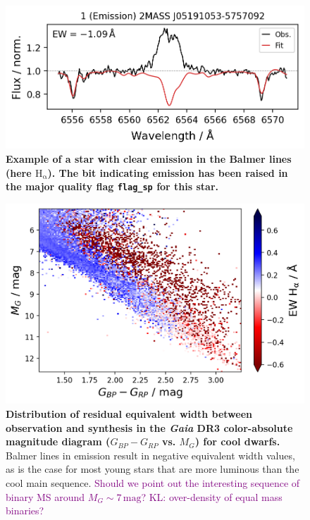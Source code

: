 \documentclass[
  journal=pasa,
  manuscript=research-paper, %
  year=2024,
  volume=37
]{cup-journal}
\newcommand{\SB}[1]{{\textcolor{purple}{#1}}}
\newcommand{\Gaia}{\textit{Gaia}\xspace}
\begin{document}
\begin{figure}[ht]
 \centering
 \includegraphics[width=\textwidth]{figures/examples_flag_sp_1.png}
 \caption{\textbf{Example of a star with clear emission in the Balmer lines (here $\mathrm{H_\upalpha}$). The bit indicating emission has been raised in the major quality flag \texttt{flag\_sp} for this star.}} \label{fig:examples_flag_sp_1}
\end{figure}

\begin{figure}[ht]
 \centering
 \includegraphics[width=\textwidth]{figures/emission_young_stars.png}
 \caption{\textbf{Distribution of residual equivalent width between observation and synthesis in the \Gaia DR3 color-absolute magnitude diagram ($G_{BP}-G_{RP}$ vs. $M_G$) for cool dwarfs.} Balmer lines in emission result in negative equivalent width values, as is the case for most young stars that are more luminous than the cool main sequence. \SB{Should we point out the interesting sequence of binary MS around $M_G \sim 7\,\mathrm{mag}$? KL: over-density of equal mass binaries?}} \label{fig:emission_young_stars.png}
\end{figure}
\end{document}
